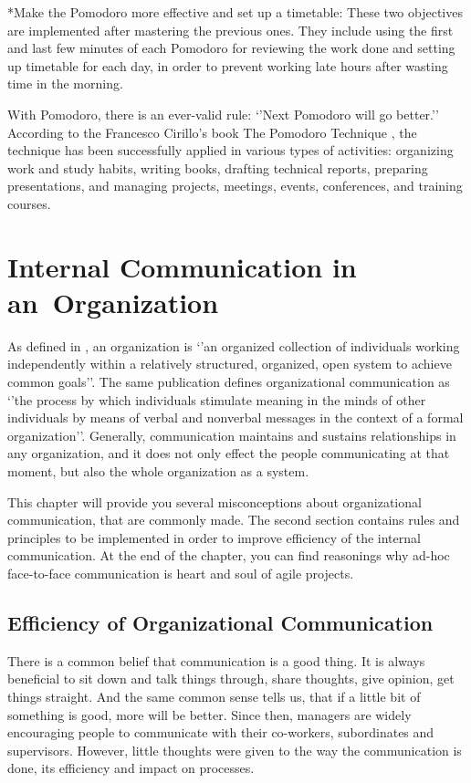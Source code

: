 \documentclass[11pt,singleside]{myfithesis2}
\makeatletter
\renewcommand\paragraph{
   \vspace{-10pt}
   \@startsection{paragraph}{4}{0mm}
      {\baselineskip}
      {- 5pt}
      {\normalfont\normalsize\bfseries}
}
\makeatother
\begin{document}
\paragraph*{Make the Pomodoro more effective and set up a timetable: } These two objectives are implemented after mastering the previous ones. They include using the first and last few minutes of each Pomodoro for reviewing the work done and setting up timetable for each day, in order to prevent working late hours after wasting time in the morning.

\vspace{\baselineskip}
With Pomodoro, there is an ever-valid rule: `'Next Pomodoro will go better.'' According to the Francesco Cirillo's book The Pomodoro Technique \cite{pomodoro}, the technique has been successfully applied in various types of activities: organizing work and study habits, writing books, drafting technical reports, preparing presentations, and managing projects, meetings, events, conferences, and training courses.


\chapter{Internal Communication in an~Organization}

As defined in \cite{orgCommForSurvival}, an organization is `'an organized collection of individuals working independently within a relatively structured, organized, open system to achieve common goals''. The same publication defines organizational communication as `'the process by which individuals stimulate meaning in the minds of other individuals by means of verbal and nonverbal messages in the context of a formal organization''. Generally, communication maintains and sustains relationships in any organization, and it does not only effect the people communicating at that moment, but also the whole organization as a system.

This chapter will provide you several misconceptions about organizational communication, that are commonly made. The second section contains rules and principles to be implemented in order to improve efficiency of the internal communication. At the end of the chapter, you can find reasonings why ad-hoc face-to-face communication is heart and soul of agile projects.


	\section{Efficiency of Organizational Communication}\label{effOfOrgComm}
There is a common belief that communication is a good thing. It is always beneficial to sit down and talk things through, share thoughts, give opinion, get things straight. And the same common sense tells us, that if a little bit of something is good, more will be better. Since then, managers are widely encouraging people to communicate with their co-workers, subordinates and supervisors. However, little thoughts were given to the way the communication is done, its efficiency and impact on processes. 
\end{document}
